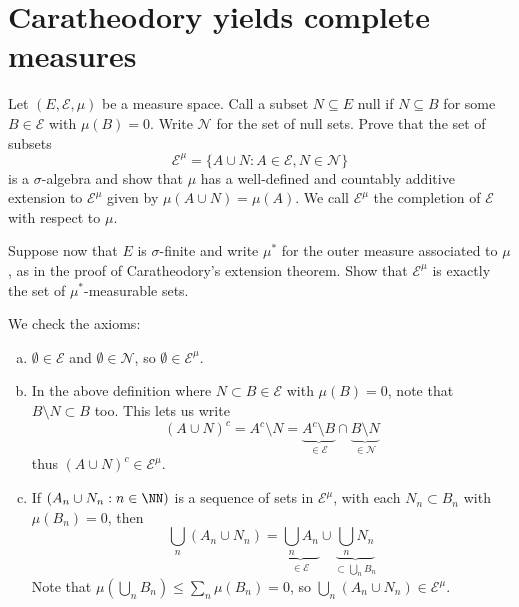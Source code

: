 \documentclass[11pt, headheight=30pt]{scrartcl}
\begin{document}
\section{Caratheodory yields complete measures}

\begin{prob}
    Let $(E, \mathcal{E}, \mu)$ be a measure space. Call a subset $N \subseteq E$ null if
    $N \subseteq B$ for some $B \in \mathcal{E}$ with $\mu(B) = 0$.
    Write $\mathcal{N}$ for the set of null sets.
    Prove that the set of subsets
    \[
        \mathcal{E}^\mu = \{A \cup N : A \in \mathcal{E}, N \in \mathcal{N}\}
    \]
    is a $\sigma$-algebra and show that $\mu$ has a well-defined and countably
    additive extension to $\mathcal{E}^\mu$ given by $\mu(A \cup N) = \mu(A)$.
    We call $\mathcal{E}^\mu$ the completion of $\mathcal{E}$ with respect to
    $\mu$.
    
    Suppose now that $E$ is $\sigma$-finite and write $\mu^*$
    for the outer measure associated to $\mu$, as in the proof of Caratheodory's
    extension theorem. Show that $\mathcal{E}^\mu$ is exactly the
    set of $\mu^*$-measurable sets.
\end{prob}

\begin{psec*}
    We check the axioms:
    \begin{enumerate}[(a)]
        \item $\emptyset \in \mathcal{E}$ and $\emptyset \in \mathcal{N}$,
        so $\emptyset \in \mathcal{E}^\mu$.
        \item In the above definition where $N\subset B \in \mathcal{E}$ with $\mu(B) = 0$,
        note that $B\setminus N \subset B$ too. This lets us write
        \[
            \left(A\cup N\right)^c = A^c \setminus N
            = \underbrace{A^c\setminus B}_{\in \mathcal{E}} \cap \underbrace{B\setminus N}_{\in \mathcal{N}}
        \]
        thus $\left(A\cup N\right)^c \in \mathcal{E}^\mu$.

        \item If $(A_n\cup N_n : n\in \NN)$ is a sequence of sets in $\mathcal{E}^\mu$,
        with each $N_n\subset B_n$ with $\mu(B_n) = 0$,
        then
        \[
            \bigcup_n \left(A_n\cup N_n\right) = \underbrace{\bigcup_n A_n}_{\in \mathcal{E}} \cup \underbrace{\bigcup_n N_n}_{\subset \bigcup_n B_n}
        \]
        Note that $\mu\left(\bigcup_n B_n\right)\leq \sum_n \mu(B_n) = 0$,
        so $\bigcup_n \left(A_n\cup N_n\right) \in \mathcal{E}^\mu$.
    \end{enumerate}
\end{psec*}
\end{document}
